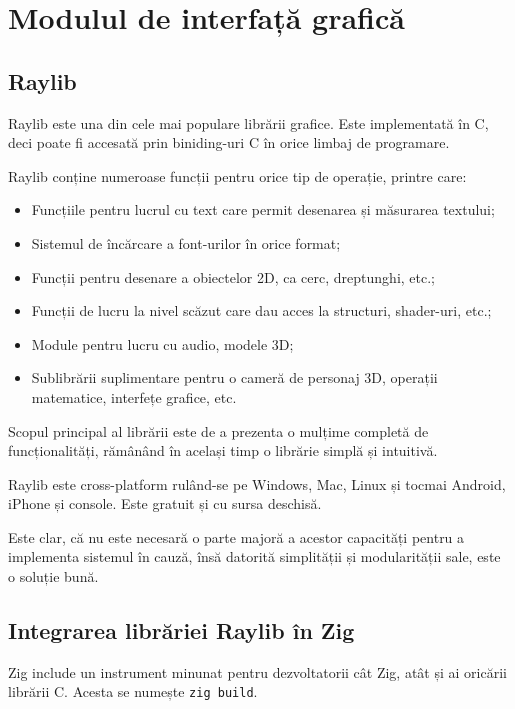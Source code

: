\documentclass[a4paper,12pt]{report}
\begin{document}
\section{Modulul de interfață grafică}

\subsection{Raylib}

Raylib este una din cele mai populare librării grafice.
Este implementată în C, deci poate fi accesată prin biniding-uri C în orice limbaj de programare.

Raylib conține numeroase funcții pentru orice tip de operație, printre care:
\begin{itemize}
    \item Funcțiile pentru lucrul cu text care permit desenarea și măsurarea textului;
    \item Sistemul de încărcare a font-urilor în orice format;
    \item Funcții pentru desenare a obiectelor \ac{2D}, ca cerc, dreptunghi, etc.;
    \item Funcții de lucru la nivel scăzut care dau acces la structuri, shader-uri, etc.;
    \item Module pentru lucru cu audio, modele \ac{3D};
    \item Sublibrării suplimentare pentru o cameră de personaj \ac{3D}, operații matematice, interfețe grafice, etc.
\end{itemize}

Scopul principal al librării este de a prezenta o mulțime completă de funcționalități,
rămânând în același timp o librărie simplă și intuitivă.

Raylib este cross-platform rulând-se pe Windows, Mac, Linux și tocmai Android, iPhone și console.
Este gratuit și cu sursa deschisă.

Este clar, că nu este necesară o parte majoră a acestor capacități pentru a implementa sistemul în cauză,
însă datorită simplității și modularității sale, este o soluție bună.


\subsection{Integrarea librăriei Raylib în Zig}

Zig include un instrument minunat pentru dezvoltatorii cât Zig,
atât și ai oricării librării C. Acesta se numește \texttt{zig build}.
\end{document}

